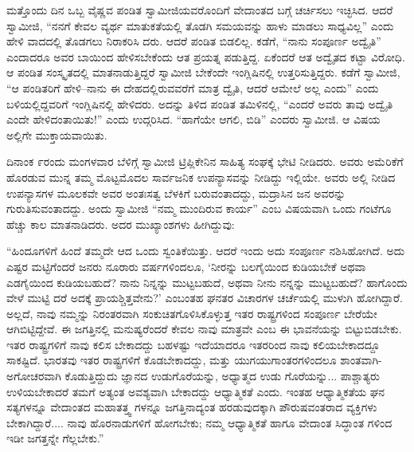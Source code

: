 ಮತ್ತೊಂದು ದಿನ ಒಬ್ಬ ವೈಷ್ಣವ ಪಂಡಿತ ಸ್ವಾಮೀಜಿಯವರೊಂದಿಗೆ ವೇದಾಂತದ ಬಗ್ಗೆ ಚರ್ಚಿಸಲು ಇಚ್ಛಿಸಿದ. ಆದರೆ ಸ್ವಾಮೀಜಿ, “ನನಗೆ ಕೇವಲ ವ್ಯರ್ಥ ಮಾತುಕತೆಯಲ್ಲಿ ತೊಡಗಿ ಸಮಯವನ್ನು ಹಾಳು ಮಾಡಲು ಸಾಧ್ಯವಿಲ್ಲ” ಎಂದು ಹೇಳಿ ವಾದದಲ್ಲಿ ತೊಡಗಲು ನಿರಾಕರಿಸಿ ದರು. ಆದರೆ ಪಂಡಿತ ಬಿಡಲಿಲ್ಲ. ಕಡೆಗೆ, “ನಾನು ಸಂಪೂರ್ಣ ಅದ್ವೈತಿ” ಎಂದಾದರೂ ಅವರ ಬಾಯಿಂದ ಹೇಳಿಸಬೇಕೆಂದು ಆತ ಪ್ರಯತ್ನ ಪಡುತ್ತಿದ್ದ. ಏಕೆಂದರೆ ಆತ ಅದ್ವೈತದ ಕಟ್ಟಾ ವಿರೋಧಿ. ಆ ಪಂಡಿತ ಸಂಸ್ಕೃತದಲ್ಲಿ ಮಾತನಾಡುತ್ತಿದ್ದರೆ ಸ್ವಾಮೀಜಿ ಬೇಕೆಂದೇ ಇಂಗ್ಲಿಷಿನಲ್ಲಿ ಉತ್ತರಿಸುತ್ತಿದ್ದರು. ಕಡೆಗೆ ಸ್ವಾಮೀಜಿ, “ಆ ಪಂಡಿತರಿಗೆ ಹೇಳಿ–ನಾನು ಈ ದೇಹದಲ್ಲಿರುವವರೆಗೆ ಮಾತ್ರ ದ್ವೈತಿ, ಆದರೆ ಆಮೇಲೆ ಅಲ್ಲ ಎಂದು” ಎಂದು ಬಳಿಯಲ್ಲಿದ್ದವರಿಗೆ ಇಂಗ್ಲಿಷಿನಲ್ಲಿ ಹೇಳಿದರು. ಅದನ್ನು ತಿಳಿದ ಪಂಡಿತ ತಮಿಳಿನಲ್ಲಿ, “ಎಂದರೆ ಅವರು ತಾವು ಅದ್ವೈತಿ ಎಂದೇ ಹೇಳಿದಂತಾಯಿತು!” ಎಂದು ಉದ್ಗರಿಸಿದ. “ಹಾಗೆಯೇ ಆಗಲಿ, ಬಿಡಿ” ಎಂದರು ಸ್ವಾಮೀಜಿ. ಆ ವಿಷಯ ಅಲ್ಲಿಗೇ ಮುಕ್ತಾಯವಾಯಿತು.

ದಿನಾಂಕ ೯ರಂದು ಮಂಗಳವಾರ ಬೆಳಿಗ್ಗೆ ಸ್ವಾಮೀಜಿ ಟ್ರಿಪ್ಲಿಕೇನಿನ ಸಾಹಿತ್ಯ ಸಂಘಕ್ಕೆ ಭೇಟಿ ನೀಡಿದರು. ಅವರು ಅಮೆರಿಕೆಗೆ ಹೊರಡುವ ಮುನ್ನ ತಮ್ಮ ಮೊಟ್ಟಮೊದಲ ಸಾರ್ವಜನಿಕ ಉಪನ್ಯಾಸವನ್ನು ನೀಡಿದ್ದು ಇಲ್ಲಿಯೇ. ಅವರು ಅಲ್ಲಿ ನೀಡಿದ ಉಪನ್ಯಾಸಗಳ ಮೂಲಕವೇ ಅವರ ಅಂತಃಸತ್ವ ಬೆಳಕಿಗೆ ಬರುವಂತಾದದ್ದು, ಮದ್ರಾಸಿನ ಜನ ಅವರನ್ನು ಗುರುತಿಸುವಂತಾದದ್ದು. ಅಂದು ಸ್ವಾಮೀಜಿ “ನಮ್ಮ ಮುಂದಿರುವ ಕಾರ್ಯ” ಎಂಬ ವಿಷಯವಾಗಿ ಒಂದು ಗಂಟೆಗೂ ಹೆಚ್ಚು ಕಾಲ ಮಾತನಾಡಿದರು. ಅದರ ಮುಖ್ಯಾಂಶಗಳು ಹೀಗಿದ್ದುವು:

“ಹಿಂದೂಗಳಿಗೆ ಹಿಂದೆ ತಮ್ಮದೇ ಆದ ಒಂದು ಸ್ವಂತಿಕೆಯಿತ್ತು. ಆದರೆ ಇಂದು ಅದು ಸಂಪೂರ್ಣ ನಶಿಸಿಹೋಗಿದೆ. ಅದು ಎಷ್ಟರ ಮಟ್ಟಿಗೆಂದರೆ ಜನರು ನೂರಾರು ವರ್ಷಗಳಿಂದಲೂ, ‘ನೀರನ್ನು ಬಲಗೈಯಿಂದ ಕುಡಿಯಬೇಕೆ ಅಥವಾ ಎಡಗೈಯಿಂದ ಕುಡಿಯಬಹುದೆ? ನಾನು ನಿನ್ನನ್ನು ಮುಟ್ಟಬಹುದೆ, ಅಥವಾ ನೀನು ನನ್ನನ್ನು ಮುಟ್ಟಬಹುದೆ? ಹಾಗೊಂದು ವೇಳೆ ಮುಟ್ಟಿ ದರೆ ಅದಕ್ಕೆ ಪ್ರಾಯಶ್ಚಿತ್ತವೇನು?’ ಎಂಬಂತಹ ಘನತರ ವಿಚಾರಗಳ ಚರ್ಚೆಯಲ್ಲಿ ಮುಳುಗಿ ಹೋಗಿದ್ದಾರೆ. ಅಲ್ಲದೆ, ನಾವು ನಮ್ಮನ್ನು ನಿರಂತರವಾಗಿ ಸಂಕುಚಿತಗೊಳಿಸಿಕೊಳ್ಳುತ್ತ ಇತರ ರಾಷ್ಟ್ರಗಳಿಂದ ಸಂಪೂರ್ಣ ಬೇರೆಯೇ ಆಗಿಬಿಟ್ಟಿದ್ದೇವೆ. ಈ ಜಗತ್ತಿನಲ್ಲಿ ಮನುಷ್ಯರೆಂದರೆ ಕೇವಲ ನಾವು ಮಾತ್ರವೇ ಎಂಬ ಈ ಭಾವನೆಯನ್ನು ಬಿಟ್ಟುಬಿಡಬೇಕು. ಇತರ ರಾಷ್ಟ್ರಗಳಿಗೆ ನಾವು ಕಲಿಸ ಬೇಕಾದದ್ದು ಬಹಳಷ್ಟು ಇದೆಯಾದರೂ ಇತರರಿಂದ ನಾವು ಕಲಿಯಬೇಕಾದದ್ದೂ ಸಾಕಷ್ಟಿದೆ. ಭಾರತವು ಇತರ ರಾಷ್ಟ್ರಗಳಿಗೆ ಕೊಡಬೇಕಾದದ್ದು, ಮತ್ತು ಯುಗಯುಗಾಂತರಗಳಿಂದಲೂ ಶಾಂತವಾಗಿ-ಅಗೋಚರವಾಗಿ ಕೊಡುತ್ತಿದ್ದುದು ಜ್ಞಾನದ ಉಡುಗೊರೆಯನ್ನು, ಅಧ್ಯಾತ್ಮದ ಉಡು ಗೊರೆಯನ್ನು... ಪಾಶ್ಚಾತ್ಯರು ಉಳಿಯಬೇಕಾದರೆ ತಮಗೆ ಅತ್ಯಂತ ಅವಶ್ಯವಾಗಿ ಬೇಕಾದದ್ದು ಆಧ್ಯಾತ್ಮಿಕತೆ ಎಂದು. ಇಂತಹ ಆಧ್ಯಾತ್ಮಿಕತೆಯ ಘನ ಸತ್ಯಗಳನ್ನೂ ವೇದಾಂತದ ಮಹಾತತ್ತ್ವ ಗಳನ್ನೂ ಜಗತ್ತಿನಾದ್ಯಂತ ಹರಡುವುದಕ್ಕಾಗಿ ಪೌರುಷವಂತರಾದ ವ್ಯಕ್ತಿಗಳು ಬೇಕಾಗಿದ್ದಾರೆ.... ನಾವು ಹೊರನಾಡುಗಳಿಗೆ ಹೋಗಬೇಕು; ನಮ್ಮ ಆಧ್ಯಾತ್ಮಿಕತೆ ಹಾಗೂ ವೇದಾಂತ ಸಿದ್ಧಾಂತ ಗಳಿಂದ ಇಡೀ ಜಗತ್ತನ್ನೇ ಗೆಲ್ಲಬೇಕು.”

